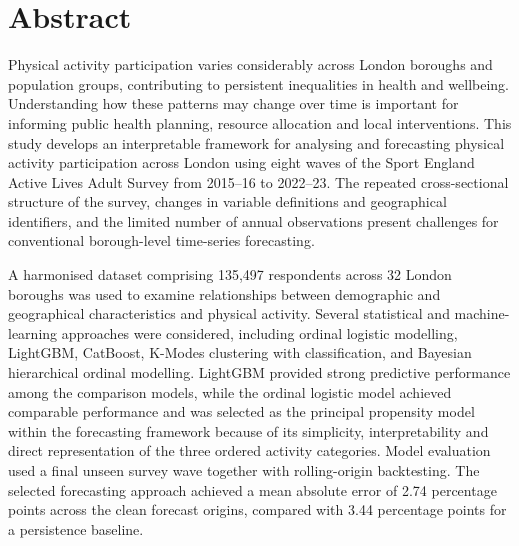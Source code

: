\documentclass[ %
                    author={Ashrey Ashrey, Sanya Kapoor, Trisha Sharma, Yash Bhooshan Pandloskar},
                supervisor={Dr. Dalila O’Grady},
                    degree={MSc},
                     title={Using machine learning to forecast physical activity participation, volunteering and activity patterns in London},
                  subtitle={},
                      type={},
                      year={2021}]{dissertation}
\begin{document}
\frontmatter


\makedecl


\tableofcontents
\listoffigures
\listoftables
\listofalgorithms
\lstlistoflistings



\chapter*{Abstract}

Physical activity participation varies considerably across London boroughs and population groups, contributing to persistent inequalities in health and wellbeing. Understanding how these patterns may change over time is important for informing public health planning, resource allocation and local interventions. This study develops an interpretable framework for analysing and forecasting physical activity participation across London using eight waves of the Sport England Active Lives Adult Survey from 2015--16 to 2022--23. The repeated cross-sectional structure of the survey, changes in variable definitions and geographical identifiers, and the limited number of annual observations present challenges for conventional borough-level time-series forecasting.

A harmonised dataset comprising 135,497 respondents across 32 London boroughs was used to examine relationships between demographic and geographical characteristics and physical activity. Several statistical and machine-learning approaches were considered, including ordinal logistic modelling, LightGBM, CatBoost, K-Modes clustering with classification, and Bayesian hierarchical ordinal modelling. LightGBM provided strong predictive performance among the comparison models, while the ordinal logistic model achieved comparable performance and was selected as the principal propensity model within the forecasting framework because of its simplicity, interpretability and direct representation of the three ordered activity categories. Model evaluation used a final unseen survey wave together with rolling-origin backtesting. The selected forecasting approach achieved a mean absolute error of 2.74 percentage points across the clean forecast origins, compared with 3.44 percentage points for a persistence baseline.
\end{document}

